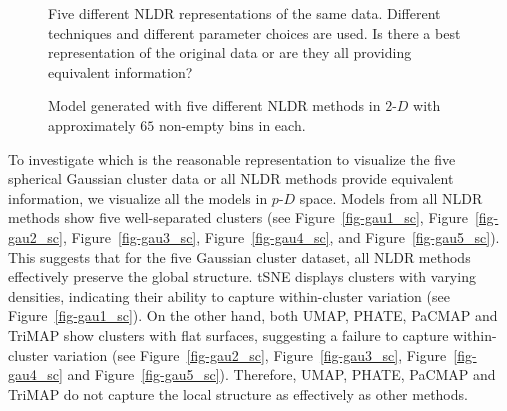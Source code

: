 \documentclass[
  12pt]{article}
\newcommand\pD{$p\text{-}D$}
\begin{document}
\begin{figure}[H]


\caption{\label{fig-NLDR-variety-gau}Five different NLDR representations
of the same data. Different techniques and different parameter choices
are used. Is there a best representation of the original data or are
they all providing equivalent information?}

\end{figure}%

\begin{figure}[H]


\caption{\label{fig-trimesh-gau}Model generated with five different NLDR
methods in \(2\text{-}D\) with approximately \(65\) non-empty bins in
each.}

\end{figure}%

To investigate which is the reasonable representation to visualize the
five spherical Gaussian cluster data or all NLDR methods provide
equivalent information, we visualize all the models in \pD{} space.
Models from all NLDR methods show five well-separated clusters (see
Figure~\ref{fig-gau1_sc}, Figure~\ref{fig-gau2_sc},
Figure~\ref{fig-gau3_sc}, Figure~\ref{fig-gau4_sc}, and
Figure~\ref{fig-gau5_sc}). This suggests that for the five Gaussian
cluster dataset, all NLDR methods effectively preserve the global
structure. tSNE displays clusters with varying densities, indicating
their ability to capture within-cluster variation (see
Figure~\ref{fig-gau1_sc}). On the other hand, both UMAP, PHATE, PaCMAP
and TriMAP show clusters with flat surfaces, suggesting a failure to
capture within-cluster variation (see Figure~\ref{fig-gau2_sc},
Figure~\ref{fig-gau3_sc}, Figure~\ref{fig-gau4_sc} and
Figure~\ref{fig-gau5_sc}). Therefore, UMAP, PHATE, PaCMAP and TriMAP do
not capture the local structure as effectively as other methods.
\end{document}
